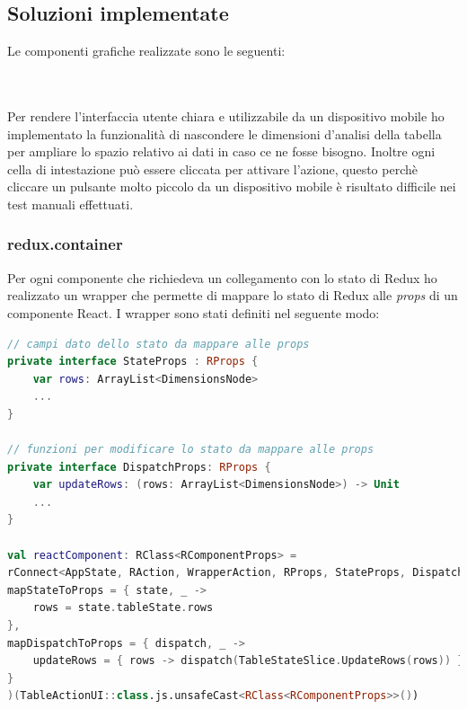 \subsection{Soluzioni implementate}
Le componenti grafiche realizzate sono le seguenti: \\
\begin{minipage}{\linewidth}
\end{minipage}
\\
\\
Per rendere l'interfaccia utente chiara e utilizzabile da un dispositivo mobile ho implementato la funzionalità di nascondere le dimensioni d'analisi della tabella per ampliare lo spazio relativo ai dati in caso ce ne fosse bisogno. Inoltre ogni cella di intestazione può essere cliccata per attivare l'azione, questo perchè cliccare un pulsante molto piccolo da un dispositivo mobile è risultato difficile nei test manuali effettuati.

\subsubsection{redux.container}
Per ogni componente che richiedeva un collegamento con lo stato di Redux ho realizzato un wrapper che permette di mappare lo stato di Redux alle \emph{props} di un componente React. I wrapper sono stati definiti nel seguente modo:
\begin{lstlisting}[caption={BodyCells}, label={lst:bodycells}, language=Kotlin]
// campi dato dello stato da mappare alle props
private interface StateProps : RProps {
	var rows: ArrayList<DimensionsNode>
	...
}

// funzioni per modificare lo stato da mappare alle props
private interface DispatchProps: RProps {
	var updateRows: (rows: ArrayList<DimensionsNode>) -> Unit
	...
}

val reactComponent: RClass<RComponentProps> =
rConnect<AppState, RAction, WrapperAction, RProps, StateProps, DispatchProps, RComponentProps>(
mapStateToProps = { state, _ ->
	rows = state.tableState.rows
},
mapDispatchToProps = { dispatch, _ ->
	updateRows = { rows -> dispatch(TableStateSlice.UpdateRows(rows)) }
}
)(TableActionUI::class.js.unsafeCast<RClass<RComponentProps>>())
\end{lstlisting}
